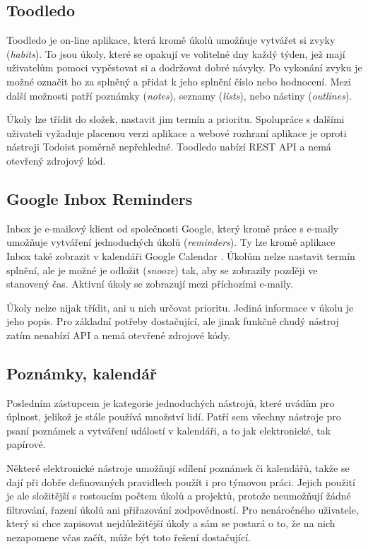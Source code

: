\documentclass[thesis=B,czech]{FITthesis}[2012/06/26]
\begin{document}
		\subsection{Toodledo}
			Toodledo \cite{toodledo} je on-line aplikace, která kromě úkolů umožňuje vytvářet si zvyky (\textit{habits}). To jsou úkoly, které se opakují ve volitelné dny každý týden, jež mají uživatelům pomoci vypěstovat si a dodržovat dobré návyky. Po vykonání zvyku je možné označit ho za splněný a přidat k jeho splnění číslo nebo hodnocení. Mezi další možnosti patří poznámky (\textit{notes}), seznamy (\textit{lists}), nebo nástiny (\textit{outlines}). 
			
			Úkoly lze třídit do složek, nastavit jim termín a prioritu. Spolupráce s dalšími uživateli vyžaduje placenou verzi aplikace a webové rozhraní aplikace je oproti nástroji Todoist poměrně nepřehledné. Toodledo nabízí REST API \cite{toodledo-api} a nemá otevřený zdrojový kód.
			
		\subsection{Google Inbox Reminders}
			Inbox \cite{ginbox} je e-mailový klient od společnosti Google, který kromě práce s e-maily umožňuje vytváření jednoduchých úkolů (\textit{reminders}). Ty lze kromě aplikace Inbox také zobrazit v kalendáři Google Calendar \cite{gcal}. Úkolům nelze nastavit termín splnění, ale je možné je odložit (\textit{snooze}) tak, aby se zobrazily později ve stanovený čas. Aktivní úkoly se zobrazují mezi příchozími e-maily.
			
			Úkoly nelze nijak třídit, ani u nich určovat prioritu. Jediná informace v úkolu je jeho popis. Pro základní potřeby dostačující, ale jinak funkčně chudý nástroj zatím nenabízí API \cite{ginbox-no-api} a nemá otevřené zdrojové kódy.
			
			
			
		\subsection{Poznámky, kalendář}
			Posledním zástupcem je kategorie jednoduchých nástrojů, které uvádím pro úplnost, jelikož je stále používá množství lidí. Patří sem všechny nástroje pro psaní poznámek a vytváření událostí v kalendáři, a to jak elektronické, tak papírové. 
			
			Některé elektronické nástroje umožňují sdílení poznámek či kalendářů, takže se dají při dobře definovaných pravidlech použít i pro týmovou práci. Jejich použití je ale složitější s rostoucím počtem úkolů a projektů, protože neumožňují žádné filtrování, řazení úkolů ani přiřazování zodpovědností. Pro nenáročného uživatele, který si chce zapisovat nejdůležitější úkoly a sám se postará o to, že na nich nezapomene včas začít, může být toto řešení dostačující.
			
\end{document}
